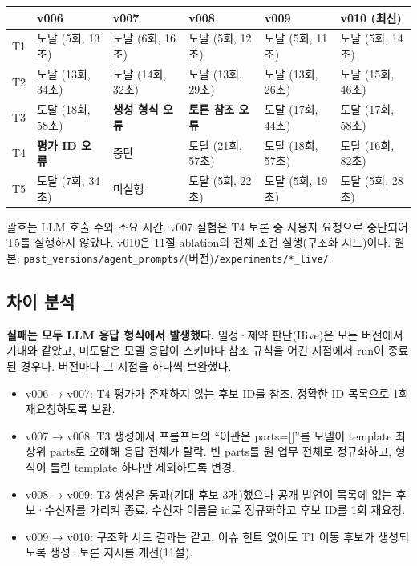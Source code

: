 \documentclass[11pt,a4paper]{article}
\begin{document}
\vspace{4mm}
\begin{tabularx}{\linewidth}{@{}p{8mm}YYYYY@{}}\toprule
 & v006 & v007 & v008 & v009 & v010 (최신)\\\midrule
T1 & 도달 (5회, 13초) & 도달 (6회, 16초) & 도달 (5회, 12초) & 도달 (5회, 11초) & 도달 (5회, 14초)\\
T2 & 도달 (13회, 34초) & 도달 (14회, 32초) & 도달 (13회, 29초) & 도달 (13회, 26초) & 도달 (15회, 46초)\\
T3 & 도달 (18회, 58초) & \textbf{생성 형식 오류} & \textbf{토론 참조 오류} & 도달 (17회, 44초) & 도달 (17회, 58초)\\
T4 & \textbf{평가 ID 오류} & 중단 & 도달 (21회, 57초) & 도달 (18회, 57초) & 도달 (16회, 82초)\\
T5 & 도달 (7회, 34초) & 미실행 & 도달 (5회, 22초) & 도달 (5회, 19초) & 도달 (5회, 28초)\\\bottomrule
\end{tabularx}

{\footnotesize 괄호는 LLM 호출 수와 소요 시간. v007 실험은 T4 토론 중 사용자 요청으로 중단되어 T5를 실행하지 않았다. v010은 11절 ablation의 전체 조건 실행(구조화 시드)이다. 원본: \texttt{past\_versions/agent\_prompts/}(버전)\texttt{/experiments/*\_live/}.}

\subsection{차이 분석}
\textbf{실패는 모두 LLM 응답 형식에서 발생했다.} 일정·제약 판단(Hive)은 모든 버전에서 기대와 같았고, 미도달은 모델 응답이 스키마나 참조 규칙을 어긴 지점에서 run이 종료된 경우다. 버전마다 그 지점을 하나씩 보완했다.
\begin{itemize}
\item v006 → v007: T4 평가가 존재하지 않는 후보 ID를 참조. 정확한 ID 목록으로 1회 재요청하도록 보완.
\item v007 → v008: T3 생성에서 프롬프트의 ``이관은 parts=[]''를 모델이 template 최상위 parts로 오해해 응답 전체가 탈락. 빈 parts를 원 업무 전체로 정규화하고, 형식이 틀린 template 하나만 제외하도록 변경.
\item v008 → v009: T3 생성은 통과(기대 후보 3개)했으나 공개 발언이 목록에 없는 후보·수신자를 가리켜 종료. 수신자 이름을 id로 정규화하고 후보 ID를 1회 재요청.
\item v009 → v010: 구조화 시드 결과는 같고, 이슈 힌트 없이도 T1 이동 후보가 생성되도록 생성·토론 지시를 개선(11절).
\end{itemize}
\end{document}
